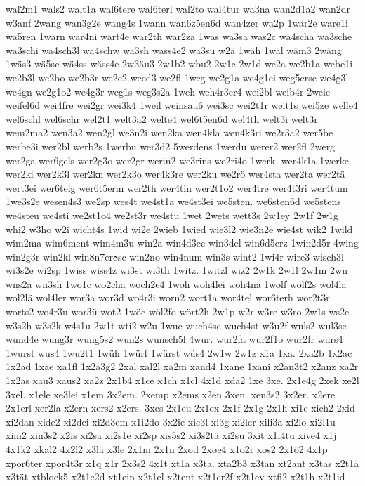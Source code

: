 {wal2m1
wals2
walt1a
wal6tere
wal6terl
wal2to
wal4tur
wa3na
wan2d1a2
wan2dr
w3anf
2wang
wan3g2e
wang4s
1wann
wan6z5en6d
wan4zer
wa2p
1war2e
ware1i
wa5ren
1warn
war4ni
wart4e
war2th
war2za
1was
wa3sa
was2c
wa4scha
wa3sche
wa3schi
wa4sch3l
wa4schw
wa3sh
wass4e2
wa3su
w2ä
1wäh
1wäl
wäm3
2wäng
1wäs3
wä5sc
wä4ss
wäss4e
2w3äu3
2w1b2
wbu2
2w1c
2w1d
we2a
we2b1a
webe1i
we2b3l
we2bo
we2b3r
we2e2
weed3
we2fl
1weg
we2g1a
we4g1ei
weg5ersc
we4g3l
we4gn
we2g1o2
we4g3r
weg1s
weg3s2a
1weh
weh4r3er4
wei2bl
weib4r
2weie
weifel6d
wei4fre
wei2gr
wei3k4
1weil
weinsau6
wei3sc
wei2t1r
weit1s
wei5ze
welle4
wel6schl
wel6schr
wel2t1
welt3a2
welte4
wel6t5en6d
wel4th
welt3i
welt3r
wem2ma2
wen3a2
wen2gl
we3n2i
wen2ka
wen4kla
wen4k3ri
we2r3a2
wer5be
werbe3i
wer2bl
werb2s
1werbu
wer3d2
5werdens
1werdu
werer2
wer2fl
2werg
wer2ga
wer6gels
wer2g3o
wer2gr
werin2
we3rins
we2ri4o
1werk.
wer4k1a
1werke
wer2ki
wer2k3l
wer2kn
wer2k3o
wer4k3re
wer2ku
we2rö
wer4sta
wer2ta
wer2tä
wert3ei
wer6teig
wer6t5erm
wer2th
wer4tin
wer2t1o2
wer4tre
wer4t3ri
wer4tum
1we3s2e
wesen4s3
we2sp
wes4t
we4st1a
we4st3ei
we5sten.
we6sten6d
we5stens
we4steu
we4sti
we2st1o4
we2st3r
we4stu
1wet
2wets
wett3s
2w1ey
2w1f
2w1g
whi2
w3ho
w2i
wicht4s
1wid
wi2e
2wieb
1wied
wie3l2
wie3n2e
wie4st
wik2
1wild
wim2ma
wim6ment
wim4m3u
win2a
win4d3ec
win3del
win6d5erz
1win2d5r
4wing
win2g3r
win2kl
win8n7er8sc
win2no
win4num
win3s
wint2
1wi4r
wire3
wisch3l
wi3s2e
wi2sp
1wiss
wiss4z
wi3st
wi3th
1witz.
1witzl
wiz2
2w1k
2w1l
2w1m
2wn
wns2a
wn3sh
1wo1c
wo2cha
woch2e4
1woh
woh4lei
woh4na
1wolf
wolf2s
wol4la
wol2lä
wol4ler
wor3a
wor3d
wo4r3i
worn2
wort1a
wor4tel
wor6terh
wor2t3r
worts2
wo4r3u
wor3ü
wot2
1wöc
wöl2fo
wört2h
2w1p
w2r
w3re
w3ro
2w1s
ws2e
w3s2h
w3s2k
w4s1u
2w1t
wti2
w2u
1wuc
wuch4sc
wuch4st
w3u2f
wuls2
wul3se
wund4e
wung3r
wung5s2
wun2s
wunsch5l
4wur.
wur2fa
wur2f1o
wur2fr
wurs4
1wurst
wus4
1wu2t1
1wüh
1würf
1würst
wüs4
2w1w
2w1z
x1a
1xa.
2xa2b
1x2ac
1x2ad
1xae
xa1fl
1x2a3g2
2xal
xal2l
xa2m
xand4
1xane
1xani
x2an3t2
x2anz
xa2r
1x2as
xau3
xaus2
xa2z
2x1b4
x1ce
x1ch
x1cl
4x1d
xda2
1xe
3xe.
2x1e4g
2xek
xe2l
3xel.
x1ele
xe3lei
x1em
3x2em.
2xemp
x2ems
x2en
3xen.
xen3s2
3x2er.
x2ere
2x1erl
xer2la
x2ern
xers2
x2ers.
3xes
2x1eu
2x1ex
2x1f
2x1g
2x1h
xi1c
xich2
2xid
xi2dan
xide2
xi2dei
xi2d3em
x1i2do
3x2ie
xie3l
xi3g
xi2ler
xili3a
xi2lo
xi2l1u
xim2
xin3s2
x2is
xi2sa
xi2s1e
xi2sp
xis5s2
xi3s2tä
xi2su
3xit
x1i4tu
xive4
x1j
4x1k2
xkal2
4x2l2
x3lä
x3le
2x1m
2x1n
2xod
2xoe4
x1o2r
xos2
2x1ö2
4x1p
xpor6ter
xpor4t3r
x1q
x1r
2x3s2
4x1t
xt1a
x3ta.
xta2b3
x3tan
xt2ant
x3tas
x2t1ä
x3tät
xtblock5
x2t1e2d
xt1ein
x2t1el
x2tent
x2t1er2f
x2t1ev
xtfi2
x2t1h
x2t1id
}
